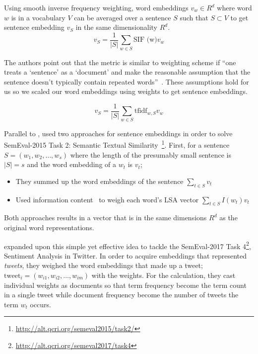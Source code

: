 Using smooth inverse frequency weighting, word embeddings $v_w \in R^{d}$ where word $w$ is in a vocabulary $V$ can be averaged over a sentence $S$ such that $S \subset V$ to get sentence embedding $v_S$ in the same dimensionality $R^{d}$.
\begin{equation}
    v_S = \frac{1}{|S|}\sum_{w \in S}\text{SIF (w)}v_{w}
\end{equation}

The authors point out that the metric is similar to \tfidf{} weighting scheme if \enquote{one treats a \enquote{sentence} as a \enquote{document} and make the reasonable assumption that the sentence doesn't typically contain repeated words}~\cite{arora_simple_2016}.
These assumptions hold for us so we scaled our word embeddings using \tfidf{} weights to get sentence embeddings.

\begin{equation}
    v_S = \frac{1}{|S|}\sum_{w \in S}\text{tfidf}_{w,S} v_w
\end{equation}

Parallel to \citeauthor{arora_simple_2016}, \textcite{zhao_ecnu_2015} used two approaches for sentence embeddings in order to solve SemEval-2015 Task 2: Semantic Textual Similarity~\footnote{\url{http://alt.qcri.org/semeval2015/task2/}}.
First, for a sentence $S = (w_{1}, w_{2}, \dots, w_{s})$ where the length of the presumably small sentence is $|S| = s$ and the word embedding of a $w_t$ is $v_t$;
\begin{itemize}
    \item They summed up the word embeddings of the sentence $\sum_{t \in S}v_{t}$
    \item Used information content~\cite{saric_takelab_2012} to weigh each word's LSA vector $\sum_{t \in S} I(w_t) v_{t}$
\end{itemize}
Both approaches results in a vector that is in the same dimensions $R^{d}$ as the original word representations.

\textcite{edilson_a._correa_nilc-usp_2017} expanded upon this simple yet effective idea to tackle the SemEval-2017 Task 4\footnote{\url{http://alt.qcri.org/semeval2017/task4}}, Sentiment Analysis in Twitter.
In order to acquire embeddings that represented \emph{tweets}, they weighed the word embeddings that made up a tweet; $\text{tweet}_i = (w_{i1}, w_{i2}, \dots, w_{im})$ with the \tfidf{} weights.
For the \tfidf{} calculation, they cast individual weights as documents so that term frequency become the term count in a single tweet while document frequency become the number of tweets the term $w_t$ occurs.

